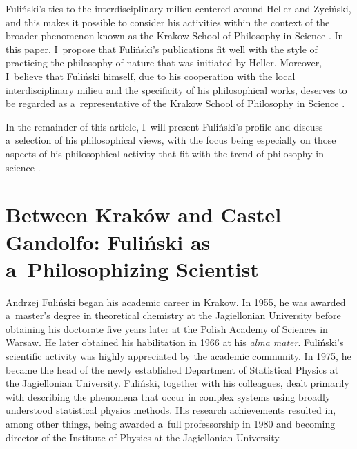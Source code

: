 Fuliński's ties to the interdisciplinary milieu centered around Heller and Zyciński, and this makes it possible to consider his activities within the context of the broader phenomenon known as the Krakow School of Philosophy in Science 
\parencites[][p.226]{trombik_koncepcje_2021}[][]{polak_krakow_2022}. %
 In this paper, I~propose that Fuliński's publications fit well with the style of practicing the philosophy of nature that was initiated by Heller. Moreover, I~believe that Fuliński himself, due to his cooperation with the local interdisciplinary milieu and the specificity of his philosophical works, deserves to be regarded as a~representative of the Krakow School of Philosophy in Science 
\parencite[see][]{polak_krakow_2022}.%




In the remainder of this article, I~will present Fuliński's profile and discuss a~selection of his philosophical views, with the focus being especially on those aspects of his philosophical activity that fit with the trend of philosophy in science 
\parencites[][]{polak_philosophy_2019}[][]{trombik_koncepcje_2021}.%




\section{Between Kraków and Castel Gandolfo: Fuliński as a~Philosophizing Scientist}

Andrzej Fuliński began his academic career in Krakow. In 1955, he was awarded a~master's degree in theoretical chemistry at the Jagiellonian University before obtaining his doctorate five years later at the Polish Academy of Sciences in Warsaw. He later obtained his habilitation in 1966 at his \textit{alma mater}. Fuliński's scientific activity was highly appreciated by the academic community. In 1975, he became the head of the newly established Department of Statistical Physics at the Jagiellonian University. Fuliński, together with his colleagues, dealt primarily with describing the phenomena that occur in complex systems using broadly understood statistical physics methods. His research achievements resulted in, among other things, being awarded a~full professorship in 1980 and becoming director of the Institute of Physics at the Jagiellonian University.



